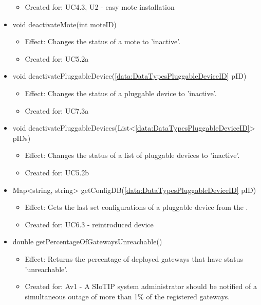 \begin{description}
\begin{itemize}[noitemsep,nolistsep,leftmargin=-.25cm]
\begin{itemize}[noitemsep,nolistsep]
\item Created for: UC4.3, U2 - easy mote installation
        \end{itemize}
      \item \textsf{void deactivateMote(int moteID)}
        \begin{itemize}[noitemsep,nolistsep]
           \item Effect: Changes the status of a mote to 'inactive'.
\item Created for: UC5.2a
        \end{itemize}
      \item \textsf{void deactivatePluggableDevice(\ref{data:DataTypesPluggableDeviceID} pID)}
        \begin{itemize}[noitemsep,nolistsep]
           \item Effect: Changes the status of a pluggable device to 'inactive'.
\item Created for: UC7.3a
        \end{itemize}
      \item \textsf{void deactivatePluggableDevices(List\textless{}\ref{data:DataTypesPluggableDeviceID}\textgreater{} pIDs)}
        \begin{itemize}[noitemsep,nolistsep]
           \item Effect: Changes the status of a list of pluggable devices to 'inactive'.
\item Created for: UC5.2b
        \end{itemize}
      \item \textsf{Map\textless{}string, string\textgreater{} getConfigDB(\ref{data:DataTypesPluggableDeviceID} pID)}
        \begin{itemize}[noitemsep,nolistsep]
           \item Effect: Gets the last set configurations of a pluggable device from the .
\item Created for: UC6.3 - reintroduced device
        \end{itemize}
      \item \textsf{double getPercentageOfGatewaysUnreachable()}
        \begin{itemize}[noitemsep,nolistsep]
           \item Effect: Returns the percentage of deployed gateways that have status 'unreachable'.
\item Created for: Av1 - A SIoTIP system administrator should be notified of a simultaneous outage of more than 1\% of the registered gateways.

\end{itemize}
\end{itemize}
\end{description}
